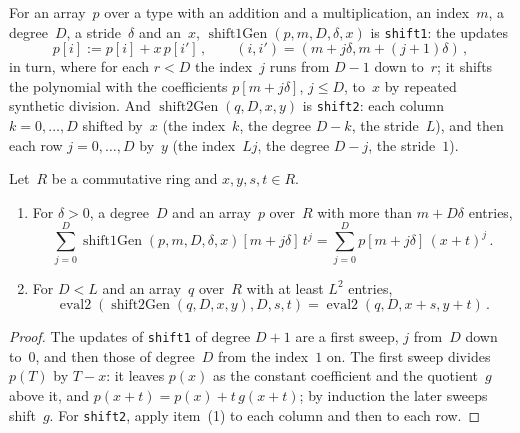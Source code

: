 \begin{definition}\label{def:shift2Gen}
  \leanok
  For an array~$p$ over a type with an addition and a multiplication, an index~$m$, a
  degree~$D$, a stride~$\delta$ and an~$x$, $\operatorname{shift1Gen}(p, m, D, \delta, x)$ is
  \texttt{shift1}: the updates
  \[
    p[i] := p[i] + x\, p[i']\,, \qquad (i, i') = (m + j\delta, m + (j + 1)\delta)\,,
  \]
  in turn, where for each $r < D$ the index~$j$ runs from $D - 1$ down to~$r$; it shifts the
  polynomial with the coefficients $p[m + j\delta]$, $j \le D$, to~$x$ by repeated synthetic
  division. And $\operatorname{shift2Gen}(q, D, x, y)$ is \texttt{shift2}: each column
  $k = 0, \dots, D$ shifted by~$x$ (the index~$k$, the degree $D - k$, the stride~$L$), and then each
  row $j = 0, \dots, D$ by~$y$ (the index~$Lj$, the degree $D - j$, the stride~$1$).
\end{definition}

\begin{lemma}\label{lem:eval2_shift2Gen}
  \leanok
  Let~$R$ be a commutative ring and $x, y, s, t \in R$.
  \begin{enumerate}
    \item For $\delta > 0$, a degree~$D$ and an array~$p$ over~$R$ with more than $m + D\delta$
      entries,
      \[
        \sum_{j=0}^{D} \operatorname{shift1Gen}(p, m, D, \delta, x)[m + j\delta]\, t^j
          = \sum_{j=0}^{D} p[m + j\delta]\, (x + t)^j\,.
      \]
    \item For $D < L$ and an array~$q$ over~$R$ with at least $L^2$ entries,
      \[
        \operatorname{eval2}(\operatorname{shift2Gen}(q, D, x, y), D, s, t)
          = \operatorname{eval2}(q, D, x + s, y + t)\,.
      \]
  \end{enumerate}
\end{lemma}

\begin{proof}
  \leanok
  The updates of \texttt{shift1} of degree $D + 1$ are a first sweep, $j$ from~$D$ down to~$0$, and
  then those of degree~$D$ from the index~$1$ on. The first sweep divides $p(T)$ by $T - x$: it
  leaves $p(x)$ as the constant coefficient and the quotient~$g$ above it, and
  $p(x + t) = p(x) + t\, g(x + t)$; by induction the later sweeps shift~$g$. For \texttt{shift2},
  apply item~(1) to each column and then to each row.
\end{proof}

